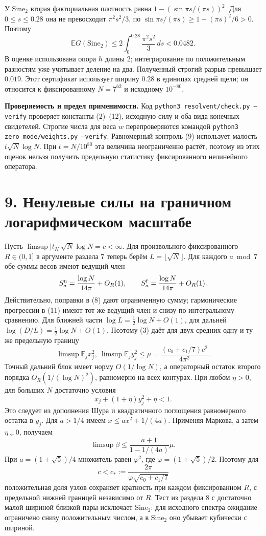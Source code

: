 \documentclass[11pt,a4paper]{article}
\newcommand{\EE}{\mathbb E}
\newcommand{\si}{\mathrm{Sine}_2}
\newcommand{\sect}[1]{\section*{\sffamily\color{ink}#1}}
\newcommand{\subt}[1]{\par\medskip\noindent\textbf{#1.}\quad}
\begin{document}
У \(\si\) вторая факториальная плотность равна \(1-(\sin\pi s/(\pi s))^2\). Для \(0\le s\le0.28\) она не превосходит \(\pi^2s^2/3\), по \(\sin\pi s/(\pi s)\ge 1-(\pi s)^2/6>0\). Поэтому
\[
          \EE G(\si)\le 2\int_0^{0.28}\frac{\pi^2s^2}{3}\,ds
                         <0.0482 .
\]
В оценке использована опора \(h\) длины \(2\); интегрирование по положительным разностям уже учитывает деление на два. Полученный строгий разрыв превышает \(0.019\). Этот сертификат использует ширину \(0.28\) в единицах средней щели; он относится к фиксированному \(N=7^{62}\) и исходному \(10^{-80}\).

\subt{Проверяемость и предел применимости}
Код \texttt{python3 resolvent/check.py --verify} проверяет константы (2)--(12), исходную силу и оба вида конечных свидетелей. Строгие числа для веса \(w\) перепроверяются командой \texttt{python3 zero\_mode/weights.py --verify}. Равномерный контроль (9) использует малость \(t\sqrt N\log N\). При \(t=N/10^{80}\) эта величина неограниченно растёт, поэтому из этих оценок нельзя получить предельную статистику фиксированного нелинейного оператора.

\newpage
\sect{9. Ненулевые силы на граничном логарифмическом масштабе}
Пусть \(\limsup |t_N|\sqrt N\log N=c<\infty\). Для произвольного фиксированного \(R\in(0,1]\) в аргументе раздела 7 теперь берём \(L=\lfloor\sqrt N\rfloor\). Для каждого \(a\bmod7\) обе суммы весов имеют ведущий член
\[
             S_a^{\rm n}=\frac{\log N}{14\pi}+O_R(1),
       \qquad S_a^{\rm f}=\frac{\log N}{14\pi}+O_R(1).
\]
Действительно, поправки в (8) дают ограниченную сумму; гармонические прогрессии в (11) имеют тот же ведущий член и снизу по интегральному сравнению. Для ближней части \(\log L=\tfrac12\log N+O(1)\), для дальней \(\log(D/L)=\tfrac12\log N+O(1)\). Поэтому (3) даёт для двух средних одну и ту же предельную границу
\[
     \limsup\EE_j x_j^2,\ \limsup\EE_j y_j^2
                \le \mu=\frac{(c_0+c_1/7)c^2}{4\pi^2}.
\]
Точный дальний блок имеет норму \(O(1/\log N)\), а операторный остаток второго порядка \(O_R(1/(\log N)^2)\), равномерно на всех контурах. При любом \(\eta>0\), для больших \(N\) достаточно условия
\[
                 x_j+(1+\eta)y_j^2+\eta<1 .
\]
Это следует из дополнения Шура и квадратичного поглощения равномерного остатка в \(y_j\). Для \(a>1/4\) имеем \(x\le a x^2+1/(4a)\). Применяя Маркова, а затем \(\eta\downarrow0\), получаем
\[
     \limsup\beta\le
       \frac{a+1}{1-1/(4a)}\mu.
\]
При \(a=(1+\sqrt5)/4\) множитель равен \(\varphi^2\), где
\(\varphi=(1+\sqrt5)/2\). Поэтому для
\[
               c<c_*:=\frac{2\pi}{\varphi\sqrt{c_0+c_1/7}}
\]
положительная доля узлов сохраняет кратность при каждом фиксированном \(R\), с предельной нижней границей независимо от \(R\). Тест из раздела 8 с достаточно малой шириной близкой пары исключает \(\si\): для исходного спектра ожидание ограничено снизу положительным числом, а в \(\si\) оно убывает кубически с шириной.
\end{document}
